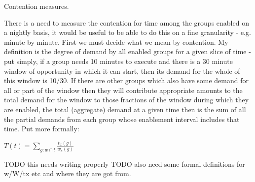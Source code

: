 Contention measures.

There is a need to measure the contention for time among the groups enabled on a nightly basis, it would be useful to be able to do this on a fine granularity - e.g. minute by minute. First we must decide what we mean by contention. My definition is the degree of demand by all enabled groups for a given slice of time - put simply, if a group needs 10 minutes to execute and there is a 30 minute window of opportunity in which it can start, then its demand for the whole of this window is 10/30. If there are other groups which also have some demand for all or part of the window then they will contribute appropriate amounts to the total demand for the window to those fractions of the window during which they are enabled, the total (aggregate) demand at a given time then is the sum of all the partial demands from each group whose enablement interval includes that time. Put more formally:

$T(t) = \sum_{g : w \cap t} { \frac{t_x(g)}{w_e(g)} }$ 

TODO this needs writing properly 
TODO also need some formal definitions for w/W/tx etc and where they are got from.

